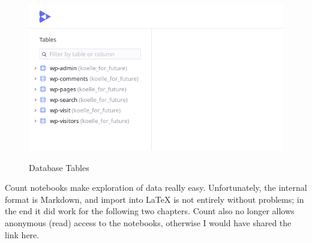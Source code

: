 \begin{figure}[H]
\centering
\caption {Database Tables}
\includegraphics[width=\linewidth]{images/tables.png}
\label{fig:tablesCount}
\end{figure}

Count notebooks make exploration of data really easy. Unfortunately, the internal format is Markdown, and import into LaTeX is not entirely without problems; in the end it did work for the following two chapters. Count also no longer allows anonymous (read) access to the notebooks, otherwise I would have shared the link here.
